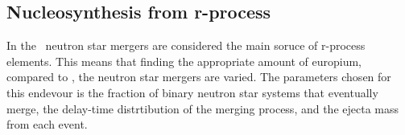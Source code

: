 \subsection{Nucleosynthesis from r-process}
In the \fiduccialomega\ neutron star mergers are considered the main soruce of r-process elements.
This means that finding the appropriate amount of europium, compared to \eris, the neutron star mergers are varied.
The parameters chosen for this endevour is the fraction of binary neutron star systems that eventually merge, the delay-time distrtibution of the merging process, and the ejecta mass from each event.

